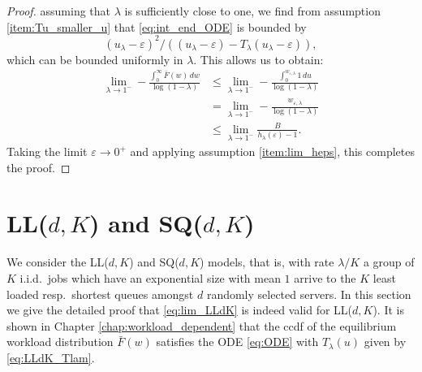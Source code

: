\documentclass[12pt]{report}
\begin{document}
\begin{proof}
assuming that $\lambda$ is sufficiently close to one, we find from assumption \ref{item:Tu_smaller_u} that \eqref{eq:int_end_ODE} is bounded by $$(u_{\lambda} - \varepsilon)^2/((u_{\lambda} - \varepsilon)-T_\lambda(u_\lambda-\varepsilon)),$$ which can be bounded uniformly in $\lambda$. This allows us to obtain:
\begin{align*}
\lim_{\lambda \rightarrow 1^-} - \frac{\int_0^\infty \bar F(w) \, dw}{\log(1-\lambda)}
&\leq \lim_{\lambda \rightarrow 1^-} -\frac{\int_0^{w_{\varepsilon,\lambda}}1 \, du}{\log(1-\lambda)}\\
&=\lim_{\lambda \rightarrow 1^-} - \frac{w_{\varepsilon, \lambda}}{\log(1-\lambda)}\\
&\leq \lim_{\lambda \rightarrow 1^-} \frac{B}{h_\lambda(\varepsilon)-1}.
\end{align*}
Taking the limit $\varepsilon \rightarrow 0^+$ and applying assumption \ref{item:lim_heps}, this completes the proof.
\end{proof}

\section{LL($d,K$) and SQ($d,K$)} \label{sec:LLdK}
We consider the LL($d,K$) and SQ($d,K$) models, that is, with rate $\lambda/K$ a group of $K$ i.i.d.~jobs which have an exponential size with mean $1$ arrive to the $K$ least loaded resp.~shortest queues amongst $d$ randomly selected servers. In this section we give the detailed proof that \eqref{eq:lim_LLdK} is indeed valid for LL($d, K$). It is shown in Chapter \ref{chap:workload_dependent} that the ccdf of the equilibrium workload distribution $\bar F(w)$ satisfies the ODE \eqref{eq:ODE} with $T_\lambda(u)$ given by \eqref{eq:LLdK_Tlam}.
\end{document}
